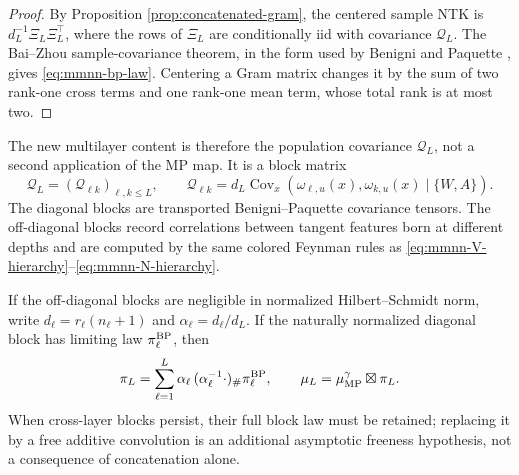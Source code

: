 \documentclass{article}
\newcommand{\Cov}{\operatorname{Cov}}
\begin{document}
\begin{proof}
By Proposition \ref{prop:concatenated-gram}, the centered sample NTK is
\(d_L^{-1}\Xi_L\Xi_L^\top\), where the rows of \(\Xi_L\) are conditionally
iid with covariance \(\mathcal Q_L\).  The Bai--Zhou sample-covariance
theorem, in the form used by Benigni and Paquette
\citep{BenigniPaquette2025}, gives
\eqref{eq:mmnn-bp-law}.  Centering a Gram matrix changes it by the sum of two
rank-one cross terms and one rank-one mean term, whose total rank is at most
two.
\end{proof}

The new multilayer content is therefore the population covariance
\(\mathcal Q_L\), not a second application of the MP map.  It is a block
matrix
\begin{equation}
\mathcal Q_L=(\mathcal Q_{\ell k})_{\ell,k\le L},
\qquad
\mathcal Q_{\ell k}
=d_L\Cov_x(\omega_{\ell,u}(x),\omega_{k,u}(x)\mid\{W,A\}).
\label{eq:bp-block-covariance}
\end{equation}
The diagonal blocks are transported Benigni--Paquette covariance tensors.
The off-diagonal blocks record correlations between tangent features born at
different depths and are computed by the same colored Feynman rules as
\eqref{eq:mmnn-V-hierarchy}--\eqref{eq:mmnn-N-hierarchy}.

If the off-diagonal blocks are negligible in normalized Hilbert--Schmidt
norm, write \(d_\ell=r_\ell(n_\ell+1)\) and
\(\alpha_\ell=d_\ell/d_L\).  If the naturally normalized diagonal block has
limiting law \(\pi_\ell^{\rm BP}\), then
\begin{equation}
\pi_L=\sum_{\ell=1}^L
\alpha_\ell\,(\alpha_\ell^{-1}\cdot)_\#\pi_\ell^{\rm BP},
\qquad
\mu_L=\mu_{\rm MP}^{\gamma}\boxtimes\pi_L.
\label{eq:bp-decoupled-mixture}
\end{equation}
When cross-layer blocks persist, their full block law must be retained;
replacing it by a free additive convolution is an additional asymptotic
freeness hypothesis, not a consequence of concatenation alone.
\end{document}
